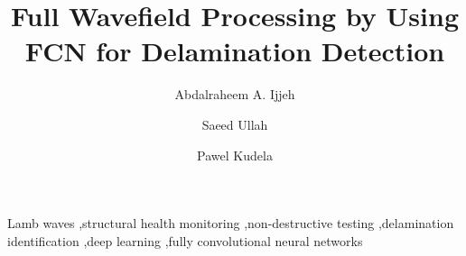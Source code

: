 \documentclass[preprint,9pt]{elsarticle}
\providecommand{\DIFaddbegin}{} %
\providecommand{\DIFaddend}{} %
\providecommand{\DIFdelbegin}{} %
\providecommand{\DIFdelend}{} %
\newcommand{\DIFscaledelfig}{0.5}
\newlength{\DIFdelgraphicswidth} %
\newlength{\DIFdelgraphicsheight} %
\newcommand{\DIFaddincludegraphics}[2][]{{\color{blue}\fbox{\DIFOincludegraphics[#1]{#2}}}} %
\newcommand{\DIFdelincludegraphics}[2][]{%
\sbox{\DIFdelgraphicsbox}{\DIFOincludegraphics[#1]{#2}}%
\settoboxwidth{\DIFdelgraphicswidth}{\DIFdelgraphicsbox} %
\settoboxtotalheight{\DIFdelgraphicsheight}{\DIFdelgraphicsbox} %
\scalebox{\DIFscaledelfig}{%
\parbox[b]{\DIFdelgraphicswidth}{\usebox{\DIFdelgraphicsbox}\\[-\baselineskip] \rule{\DIFdelgraphicswidth}{0em}}\llap{\resizebox{\DIFdelgraphicswidth}{\DIFdelgraphicsheight}{%
\setlength{\unitlength}{\DIFdelgraphicswidth}%
\begin{picture}(1,1)%
\thicklines\linethickness{2pt} %
{\color[rgb]{1,0,0}\put(0,0){\framebox(1,1){}}}%
{\color[rgb]{1,0,0}\put(0,0){\line( 1,1){1}}}%
{\color[rgb]{1,0,0}\put(0,1){\line(1,-1){1}}}%
\end{picture}%
}\hspace*{3pt}}} %
} %
\DeclareRobustCommand{\DIFaddbegin}{\DIFOaddbegin \let\includegraphics\DIFaddincludegraphics} %
\DeclareRobustCommand{\DIFaddend}{\DIFOaddend \let\includegraphics\DIFOincludegraphics} %
\DeclareRobustCommand{\DIFdelbegin}{\DIFOdelbegin \let\includegraphics\DIFdelincludegraphics} %
\DeclareRobustCommand{\DIFdelend}{\DIFOaddend \let\includegraphics\DIFOincludegraphics} %
\begin{document}
	\begin{frontmatter}

		\title{Full Wavefield Processing by Using FCN for Delamination Detection}

		\address[IFFM]{Institute of Fluid Flow Machinery, Polish Academy of Sciences, Poland}

		\author{Abdalraheem A. Ijjeh}
		\author{Saeed Ullah }
		\author{Pawel Kudela}


		\begin{abstract}
		\DIFdelbegin %
\DIFdelend \DIFaddbegin 
		\DIFaddend \end{abstract}

		\begin{keyword}
			Lamb waves \sep structural health monitoring \sep non-destructive testing \sep delamination identification \sep deep learning \sep  fully convolutional neural networks 


		\end{keyword}

	\end{frontmatter}
\end{document}
